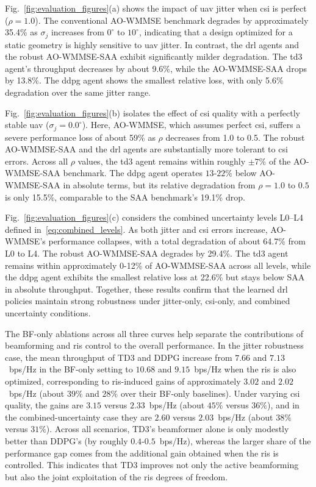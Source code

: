 \documentclass[letterpaper,journal]{IEEEtran}
\begin{document}
Fig.~\ref{fig:evaluation_figures}(a) shows the impact of \gls{uav} jitter when \gls{csi} is perfect ($\rho = 1.0$). The conventional AO-WMMSE benchmark degrades by approximately 35.4\% as $\sigma_j$ increases from $0^\circ$ to $10^\circ$, indicating that a design optimized for a static geometry is highly sensitive to \gls{uav} jitter. In contrast, the \gls{drl} agents and the robust AO-WMMSE-SAA exhibit significantly milder degradation. The \gls{td3} agent’s throughput decreases by about 9.6\%, while the AO-WMMSE-SAA drops by 13.8\%. The \gls{ddpg} agent shows the smallest relative loss, with only 5.6\% degradation over the same jitter range.

Fig.~\ref{fig:evaluation_figures}(b) isolates the effect of \gls{csi} quality with a perfectly stable \gls{uav} ($\sigma_j = 0.0^\circ$). Here, AO-WMMSE, which assumes perfect \gls{csi}, suffers a severe performance loss of about 59\% as $\rho$ decreases from 1.0 to 0.5. The robust AO-WMMSE-SAA and the \gls{drl} agents are substantially more tolerant to \gls{csi} errors. Across all $\rho$ values, the \gls{td3} agent remains within roughly $\pm 7\%$ of the AO-WMMSE-SAA benchmark. The \gls{ddpg} agent operates $13$-$22\%$ below AO-WMMSE-SAA in absolute terms, but its relative degradation from $\rho=1.0$ to $0.5$ is only 15.5\%, comparable to the SAA benchmark’s 19.1\% drop.

Fig.~\ref{fig:evaluation_figures}(c) considers the combined uncertainty levels L0--L4 defined in~\eqref{eq:combined_levels}. As both jitter and \gls{csi} errors increase, AO-WMMSE’s performance collapses, with a total degradation of about 64.7\% from L0 to L4. The robust AO-WMMSE-SAA degrades by 29.4\%. The \gls{td3} agent remains within approximately 0-12\% of AO-WMMSE-SAA across all levels, while the \gls{ddpg} agent exhibits the smallest relative loss at 22.6\% but stays below SAA in absolute throughput. Together, these results confirm that the learned \gls{drl} policies maintain strong robustness under jitter-only, \gls{csi}-only, and combined uncertainty conditions.

The BF-only ablations across all three curves help separate the contributions of beamforming and \gls{ris} control to the overall performance. In the jitter robustness case, the mean throughput of TD3 and DDPG increase from $7.66$ and $7.13$~bps/Hz in the BF-only setting to $10.68$ and $9.15$~bps/Hz when the \gls{ris} is also optimized, corresponding to \gls{ris}-induced gains of approximately $3.02$ and $2.02$~bps/Hz (about $39\%$ and $28\%$ over their BF-only baselines). Under varying \gls{csi} quality, the gains are $3.15$ versus $2.33$~bps/Hz (about $45\%$ versus $36\%$), and in the combined-uncertainty case they are $2.60$ versus $2.03$~bps/Hz (about $38\%$ versus $31\%$). Across all scenarios, TD3’s beamformer alone is only modestly better than DDPG’s (by roughly $0.4$-$0.5$~bps/Hz), whereas the larger share of the performance gap comes from the additional gain obtained when the \gls{ris} is controlled. This indicates that TD3 improves not only the active beamforming but also the joint exploitation of the \gls{ris} degrees of freedom.
\end{document}
